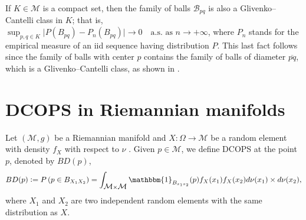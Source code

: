 \documentclass[a4paper]{article}
\def\defeq{\mathrel{\mathop:}=}
\numberwithin{equation}{section}
\def\defeq{\mathrel{\mathop:}=}
\newcommand{\M}{\mbox{$\mathcal{M}$}}
\newcommand{\I}{\mathbbm{1}}
\begin{document}
If $K \in \M$ is a compact set, then the family of balls 
$\mathcal{B}_{pq}$ is also a Glivenko--Cantelli class in $K$; that is, $\sup_{p,q \in K}  \vert  P \left(B_{pq} \right) - P_n\left(B_{pq} \right) \vert 
 \rightarrow 0  \quad \textrm{a.s. \ \  as  $n \rightarrow + \infty$}$, 
where  $P_n$ stands for the empirical measure of an iid sequence having distribution $P$. This last fact follows since the family of balls with center   $p$  contains the family of balls of diameter   $\overline{pq}$, which is a  Glivenko--Cantelli class, as shown in \cite{szabados1989}.
 
\section{DCOPS in Riemannian manifolds}
\label{dcops}
Let $(\M,g)$ be a Riemannian manifold and   $X: \Omega \rightarrow \M$ be a random element with density  $f_X$ with respect to $\nu$ . Given $p \in \M$, we define DCOPS at the point $p$, denoted by $BD(p)$, 
\begin{equation}
\begin{aligned}
BD(p)\defeq P\left( p \in B_{X_1 X_2} \right)  
= \int_{\M \times \M} \I_{B_{x_1 x_2}}(p)f_X(x_1) f_X(x_2) d \nu (x_1) \times d \nu(x_2),
\end{aligned}
\label{defprofundidad_man}
\end{equation}
where $X_1$ and $X_2$ are two independent random elements with the same distribution as $X$.
\end{document}
